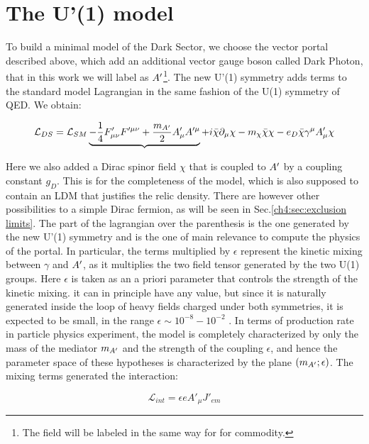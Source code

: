 \section{The U'(1) model}
\label{ch1:sec:dm-u1model}

To build a minimal model of the Dark Sector, we choose the vector portal described above, which add an additional vector gauge boson called Dark Photon, that in this work we will label as $A'$\footnote{The field will be labeled in the same way for for commodity.}. The new U'(1) symmetry adds terms to the standard model Lagrangian in the same fashion of the U(1) symmetry of QED. We obtain:

\begin{equation}
  \label{eq:dm-lagrangian}
  \mathcal{L}_{DS} = \mathcal{L}_{SM} \underbrace{- \frac{1}{4}F'_{\mu \nu}F'^{\mu \nu} + \frac{m_{A'}}{2}A'_{\mu}A'^{\mu}} + i \bar{\chi} \partial_{\mu} \chi - m_{\chi}\bar{\chi}\chi - e_D \bar{\chi}\gamma^{\mu}A'_{\mu}\chi
\end{equation}

Here we also added a Dirac spinor field $\chi$ that is coupled to $A'$ by a coupling constant $g_D$. This is for the completeness of the model, which is also supposed to contain an LDM that justifies the relic density. There are however other possibilities to a simple Dirac fermion, as will be seen in Sec.\ref{ch4:sec:exclusion limits}. The part of the lagrangian over the parenthesis is the one generated by the new U'(1) symmetry and is the one of main relevance to compute the physics of the portal. In particular, the terms multiplied by $\epsilon$ represent the kinetic mixing between $\gamma$ and $A'$, as it multiplies the two field tensor generated by the two U(1) groups. Here $\epsilon$ is taken as an a priori parameter that controls the strength of the kinetic mixing. it can in principle have any value, but since it is naturally generated inside the loop of heavy fields charged under both symmetries, it is expected to be small, in the range $\epsilon \sim 10^{-8} - 10^{-2}$ \cite{jdb}. In terms of production rate in particle physics experiment, the model is completely characterized by only the mass of the mediator $m_{A'}$ and the strength of the coupling $\epsilon$, and hence the parameter space of these hypotheses is characterized by the plane $(m_{A'};\epsilon)$. The mixing terms generated the interaction:

\begin{equation}
  \label{eq:dm-interaction}
  \mathcal{L}_{int} = \epsilon e A'_{\mu}J'_{em}
\end{equation}

